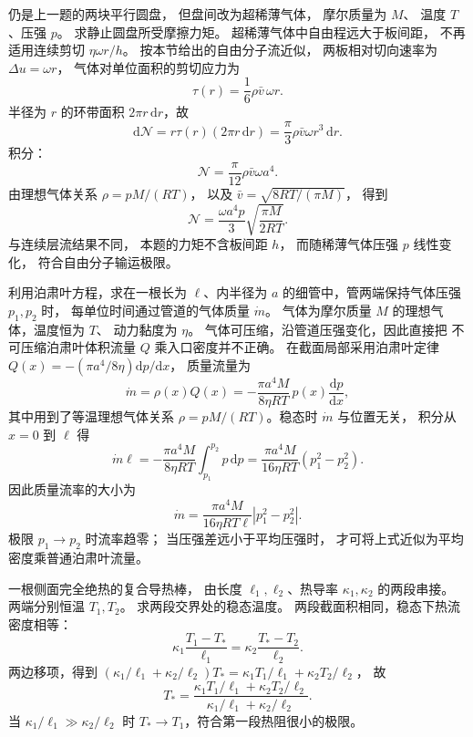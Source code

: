 仍是上一题的两块平行圆盘，
但盘间改为超稀薄气体，
摩尔质量为 $M$、
温度 $T$、压强 $p$。
求静止圆盘所受摩擦力矩。
\exsolution
超稀薄气体中自由程远大于板间距，
不再适用连续剪切
$\eta\omega r/h$。
按本节给出的自由分子流近似，
两板相对切向速率为
$\Delta u=\omega r$，
气体对单位面积的剪切应力为
\[
\tau(r)=\frac16\rho\bar v\,\omega r.
\]
半径为 $r$ 的环带面积
$2\pi r\,\mathrm dr$，故
\[
\mathrm d\mathcal N
=r\tau(r)(2\pi r\,\mathrm dr)
=\frac{\pi}3\rho\bar v\omega r^3\,\mathrm dr.
\]
积分：
\[
\mathcal N=\frac{\pi}{12}\rho\bar v\omega a^4.
\]
由理想气体关系
$\rho=pM/(RT)$，
以及
$\bar v=\sqrt{8RT/(\pi M)}$，
得到
\[
\boxed{\mathcal N=
\frac{\omega a^4p}{3}
\sqrt{\frac{\pi M}{2RT}}}.
\]
\excheck 与连续层流结果不同，
本题的力矩不含板间距 $h$，
而随稀薄气体压强 $p$ 线性变化，
符合自由分子输运极限。

利用泊肃叶方程，求在一根长为 $\ell$、内半径为 $a$
的细管中，管两端保持气体压强 $p_1,p_2$ 时，
每单位时间通过管道的气体质量 $\dot m$。
气体为摩尔质量 $M$ 的理想气体，温度恒为 $T$、
动力黏度为 $\eta$。
\exsolution
气体可压缩，沿管道压强变化，因此直接把
不可压缩泊肃叶体积流量 $Q$ 乘入口密度并不正确。
在截面局部采用泊肃叶定律
$Q(x)=-(\pi a^4/8\eta)\mathrm dp/\mathrm dx$，
质量流量为
\[
\dot m=\rho(x)Q(x)
=-\frac{\pi a^4M}{8\eta RT}\,
p(x)\frac{\mathrm dp}{\mathrm dx},
\]
其中用到了等温理想气体关系
$\rho=pM/(RT)$。稳态时 $\dot m$ 与位置无关，
积分从 $x=0$ 到 $\ell$ 得
\[
\dot m\ell
=-\frac{\pi a^4M}{8\eta RT}
\int_{p_1}^{p_2}p\,\mathrm dp
=\frac{\pi a^4M}{16\eta RT}(p_1^2-p_2^2).
\]
因此质量流率的大小为
\[
\boxed{\dot m=\frac{\pi a^4 M}{16\eta RT\ell}
|p_1^2-p_2^2|}.
\]
\excheck 极限 $p_1\to p_2$ 时流率趋零；
当压强差远小于平均压强时，
才可将上式近似为平均密度乘普通泊肃叶流量。

一根侧面完全绝热的复合导热棒，
由长度 $\ell_1,\ell_2$、热导率
$\kappa_1,\kappa_2$ 的两段串接。
两端分别恒温 $T_1,T_2$。
求两段交界处的稳态温度。
\exsolution
两段截面积相同，稳态下热流密度相等：
\[
\kappa_1\frac{T_1-T_*}{\ell_1}
=\kappa_2\frac{T_*-T_2}{\ell_2}.
\]
两边移项，得到
$(\kappa_1/\ell_1+\kappa_2/\ell_2)T_*
=\kappa_1T_1/\ell_1+\kappa_2T_2/\ell_2$，
故
\[
\boxed{T_*=
\frac{\kappa_1T_1/\ell_1+\kappa_2T_2/\ell_2}
{\kappa_1/\ell_1+\kappa_2/\ell_2}}.
\]
\excheck 当 $\kappa_1/\ell_1\gg\kappa_2/\ell_2$ 时
$T_*\to T_1$，符合第一段热阻很小的极限。


